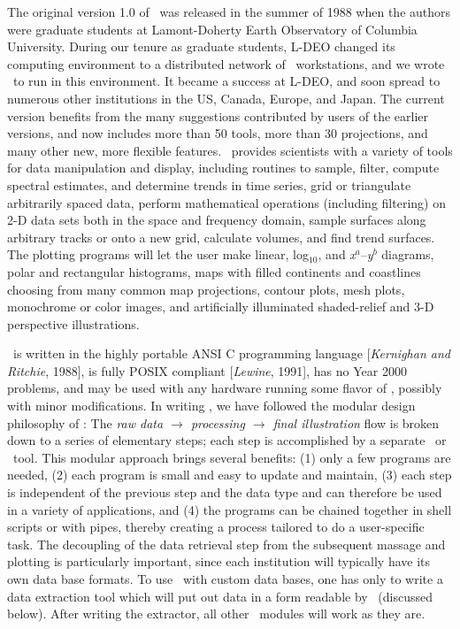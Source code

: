 The original version 1.0 of \GMT\ was released in the summer of 1988
when the authors were graduate students at Lamont-Doherty Earth
Observatory of Columbia University.
During our tenure as graduate
students, L-DEO changed its computing environment to a distributed
network of \UNIX\ workstations, and we wrote \GMT\ to run in this
environment.  It became a success at L-DEO, and soon spread to
numerous other institutions in the US, Canada, Europe, and Japan.
The current version benefits from the many suggestions
contributed by users of the earlier versions, and now includes more
than 50 tools, more than 30 projections, and many other new, more
flexible features.  \GMT\ provides scientists with a variety of
tools for data manipulation and display, including routines to sample,
filter, compute spectral estimates, and determine trends in time
series, grid or triangulate arbitrarily spaced data, perform
mathematical operations (including filtering) on 2-D data sets
both in the space and frequency domain, sample surfaces along
arbitrary tracks or onto a new grid, calculate volumes, and find
trend surfaces.  The plotting programs will let the user make linear,
log$_{10}$, and \emph{x$^a$}--\emph{y$^b$} diagrams, polar and
rectangular histograms, maps with filled continents and coastlines
choosing from many common map projections, contour plots, mesh plots,
monochrome or color images, and artificially illuminated
shaded-relief and 3-D perspective illustrations. 

\GMT\ is written in the highly portable ANSI C  programming language
[\emph{Kernighan and Ritchie}, 1988], is fully POSIX compliant
[\emph{Lewine}, 1991], has no Year 2000 problems, and may be used
with any hardware running some flavor of \UNIX, possibly with minor
modifications.  In writing \GMT, we have followed the modular
design philosophy of \UNIX: The \emph{raw data $\rightarrow$  processing $\rightarrow$
final illustration} flow is broken down to a series of elementary
steps; each step is accomplished by a separate \GMT\ or \UNIX\ tool.
This modular approach brings several benefits: (1) only a few
programs are needed, (2) each program is small and easy to update
and maintain, (3) each step is independent of the previous step
and the data type and can therefore be used in a variety of
applications, and (4) the programs can be chained together in
shell scripts or with pipes, thereby creating a process tailored
to do a user-specific task.  The  decoupling of the data retrieval
step from the subsequent massage and plotting is particularly
important, since each institution will typically have its own
data base formats.  To use \GMT\ with custom data bases, one has
only to write a data extraction tool which will put out data in a
form readable by \GMT\ (discussed below).  After writing the extractor,
all other \GMT\ modules will work as they are. 


